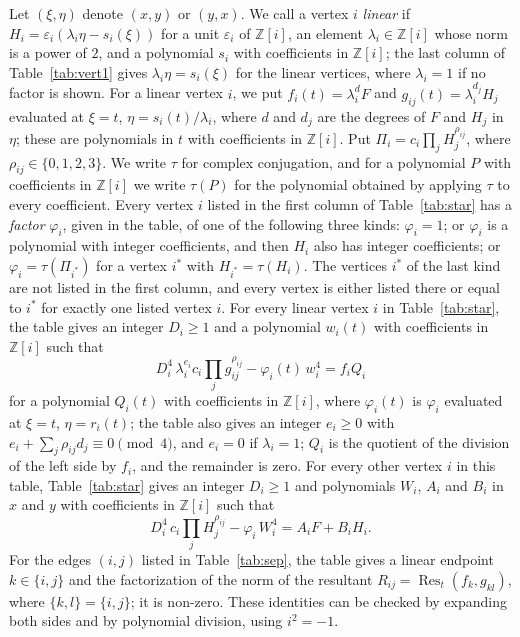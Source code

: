 \documentclass[11pt]{article}
\newcommand{\Z}{\mathbb{Z}}
\begin{document}
Let $(\xi,\eta)$ denote $(x,y)$ or $(y,x)$. We call a vertex $i$ \emph{linear} if $H_i=\varepsilon_i(\lambda_i\eta-s_i(\xi))$ for a unit $\varepsilon_i$ of $\Z[i]$, an element $\lambda_i\in\Z[i]$ whose norm is a power of $2$, and a polynomial $s_i$ with coefficients in $\Z[i]$; the last column of Table~\ref{tab:vert1} gives $\lambda_i\eta=s_i(\xi)$ for the linear vertices, where $\lambda_i=1$ if no factor is shown. For a linear vertex $i$, we put $f_i(t)=\lambda_i^{d}F$ and $g_{ij}(t)=\lambda_i^{d_j}H_j$ evaluated at $\xi=t$, $\eta=s_i(t)/\lambda_i$, where $d$ and $d_j$ are the degrees of $F$ and $H_j$ in $\eta$; these are polynomials in $t$ with coefficients in $\Z[i]$.
Put $\Pi_i=c_i\prod_jH_j^{\rho_{ij}}$, where $\rho_{ij}\in\{0,1,2,3\}$. We write $\tau$ for complex conjugation, and for a polynomial $P$ with coefficients in $\Z[i]$ we write $\tau(P)$ for the polynomial obtained by applying $\tau$ to every coefficient. Every vertex $i$ listed in the first column of Table~\ref{tab:star} has a \emph{factor} $\varphi_i$, given in the table, of one of the following three kinds: $\varphi_i=1$; or $\varphi_i$ is a polynomial with integer coefficients, and then $H_i$ also has integer coefficients; or $\varphi_i=\tau(\Pi_{i^*})$ for a vertex $i^*$ with $H_{i^*}=\tau(H_i)$. The vertices $i^*$ of the last kind are not listed in the first column, and every vertex is either listed there or equal to $i^*$ for exactly one listed vertex $i$.
For every linear vertex $i$ in Table~\ref{tab:star}, the table gives an integer $D_i\geq1$ and a polynomial $w_i(t)$ with coefficients in $\Z[i]$ such that
\begin{equation}\label{eq:starlin}
D_i^4\,\lambda_i^{e_i}c_i\prod_jg_{ij}^{\rho_{ij}}-\varphi_i(t)\,w_i^4=f_iQ_i
\end{equation}
for a polynomial $Q_i(t)$ with coefficients in $\Z[i]$, where $\varphi_i(t)$ is $\varphi_i$ evaluated at $\xi=t$, $\eta=r_i(t)$; the table also gives an integer $e_i\geq0$ with $e_i+\sum_j\rho_{ij}d_j\equiv0\pmod4$, and $e_i=0$ if $\lambda_i=1$; $Q_i$ is the quotient of the division of the left side by $f_i$, and the remainder is zero.
For every other vertex $i$ in this table, Table~\ref{tab:star} gives an integer $D_i\geq1$ and polynomials $W_i$, $A_i$ and $B_i$ in $x$ and $y$ with coefficients in $\Z[i]$ such that
\begin{equation}\label{eq:star}
D_i^4\,c_i\prod_jH_j^{\rho_{ij}}-\varphi_i\,W_i^4=A_iF+B_iH_i.
\end{equation}
For the edges $(i,j)$ listed in Table~\ref{tab:sep}, the table gives a linear endpoint $k\in\{i,j\}$ and the factorization of the norm of the resultant $R_{ij}=\operatorname{Res}_t(f_k,g_{kl})$, where $\{k,l\}=\{i,j\}$; it is non-zero.
These identities can be checked by expanding both sides and by polynomial division, using $i^2=-1$.
\end{document}

